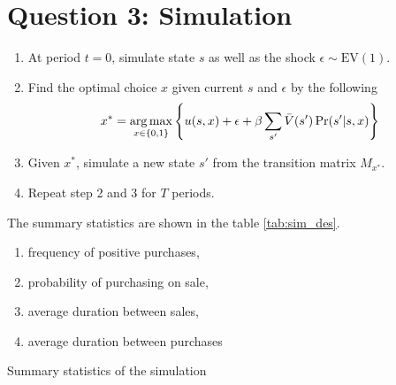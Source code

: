 \documentclass[12pt]{article}[margin=1in]
\begin{document}
\section{Question 3: Simulation}
\begin{enumerate}
    \item At period $t=0$, simulate state $s$ as well as the shock $\epsilon \sim
              \text{EV}(1)$.
    \item Find the optimal choice $x$ given current $s$ and $\epsilon$ by the following
          \begin{equation*}
              x^* = \operatorname*{arg\,max}_{x
                  \in \{0,1\}}  \left\{ u(s,x) + \epsilon+ \beta
              \sum_{s'}\bar{V}(s')\Pr(s'|s,x) \right\}
          \end{equation*}
    \item Given $x^*$, simulate a new state $s'$ from the transition matrix $M_{x^*}$.
    \item Repeat step 2 and 3 for $T$ periods.
\end{enumerate}
The  summary statistics are shown in the table \ref{tab:sim_des}.
\begin{enumerate}
    \item frequency of positive purchases,
    \item probability of purchasing on sale,
    \item average duration between sales,
    \item average duration between purchases
\end{enumerate}
\begin{table}
    \centering
    
    \caption{Summary statistics of the simulation}
    \label{tab:sim_des}
\end{table}
\end{document}
